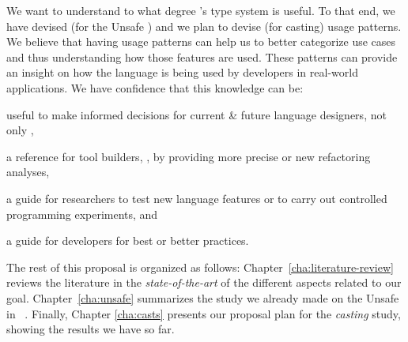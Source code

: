 We want to understand to what degree \java{}'s type system is useful.
To that end, we have devised (for the Unsafe \api{}) and we plan to devise (for casting) usage patterns.
We believe that having usage patterns can help us to better categorize use cases and thus understanding how those features are used.
These patterns can provide an insight on how the language is being used by developers in real-world applications.
We have confidence that this knowledge can be:
\begin{inparaenum}[a)]
\item useful to make informed decisions for current \& future language designers, not only \java{},
\item a reference for tool builders, \eg{}, by providing more precise or new refactoring analyses,
\item a guide for researchers to test new language features or to carry out controlled programming experiments, and
\item a guide for developers for best or better practices.
\end{inparaenum}

The rest of this proposal is organized as follows:
Chapter~\ref{cha:literature-review} reviews the literature in the \emph{state-of-the-art} of the different aspects related to our goal.
Chapter~\ref{cha:unsafe} summarizes the study we already made on the Unsafe \api{} in \java{}~\cite{mastrangeloUseYourOwn2015}.
Finally, Chapter \ref{cha:casts} presents our proposal plan for the \emph{casting} study, showing the results we have so far.